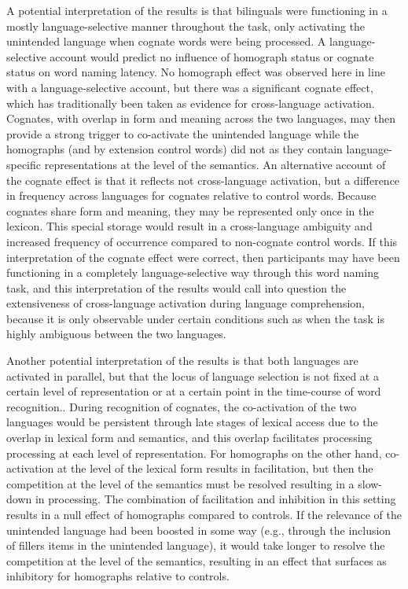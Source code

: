 A potential interpretation of the results is that bilinguals were functioning in a mostly language-selective manner throughout the task, only activating the unintended language when cognate words were being processed. A language-selective account would predict no influence of homograph status or cognate status on word naming latency. No homograph effect was observed here in line with a language-selective account, but there was a significant cognate effect, which has traditionally been taken as evidence for cross-language activation. Cognates, with overlap in form and meaning across the two languages, may then provide a strong trigger to co-activate the unintended language while the homographs (and by extension control words) did not as they contain language-specific representations at the level of the semantics. An alternative account of the cognate effect is that it reflects not cross-language activation, but a difference in frequency across languages for cognates relative to control words. Because cognates share form and meaning, they may be represented only once in the lexicon. This special storage would result in a cross-language ambiguity and increased frequency of occurrence compared to non-cognate control words. If this interpretation of the cognate effect were correct, then participants may have been functioning in a completely language-selective way through this word naming task, and this interpretation of the results would call into question the extensiveness of cross-language activation during language comprehension, because it is only observable under certain conditions such as when the task is highly ambiguous between the two languages. 

Another potential interpretation of the results is that both languages are activated in parallel, but that the locus of language selection is not fixed at a certain level of representation or at a certain point in the time-course of word recognition.. During recognition of cognates, the co-activation of the two languages would be persistent through late stages of lexical access due to the overlap in lexical form and semantics, and this overlap facilitates processing processing at each level of representation. For homographs on the other hand, co-activation at the level of the lexical form results in facilitation, but then the competition at the level of the semantics must be resolved resulting in a slow-down in processing. The combination of facilitation and inhibition in this setting results in a null effect of homographs compared to controls. If the relevance of the unintended language had been boosted in some way (e.g., through the inclusion of fillers items in the unintended language), it would take longer to resolve the competition at the level of the semantics, resulting in an effect that surfaces as inhibitory for homographs relative to controls. 

